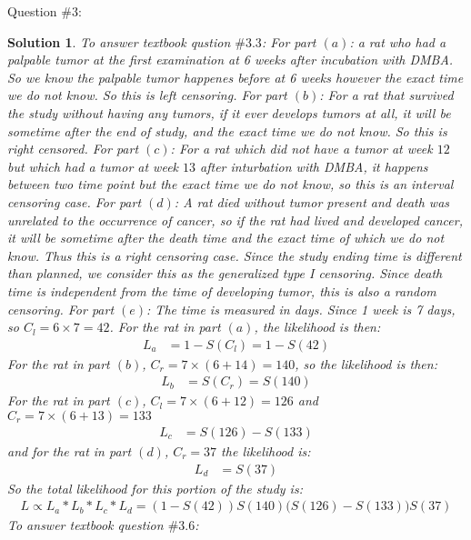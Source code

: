 \documentclass[11pt]{article}
\newtheorem{sol}{Solution}
\begin{document}
Question $\# 3$:
\begin{sol}
	To answer textbook qustion $\# 3.3$:\vskip 2mm
	For part $(a)$:\vskip 2mm
	a rat who had a palpable tumor at the first examination at 6 weeks after incubation with DMBA. So we know the palpable tumor happenes before at 6 weeks however the exact time we do not know. So this is left censoring.\vskip 2mm
	For part $(b)$:\vskip 2mm
	For a rat that survived the study without having any tumors, if it ever develops tumors at all, it will be sometime after the end of study, and the exact time we do not know. So this is right censored.\vskip 2mm
	For part $(c)$:\vskip 2mm
	For a rat which did not have a tumor at week $12$ but which had a tumor at week $13$ after inturbation with DMBA, it happens between two time point but the exact time we do not know, so this is an interval censoring case.\vskip 2mm
	For part $(d)$:\vskip 2mm
	A rat died without tumor present and death was unrelated to the occurrence of cancer, so if the rat had lived and developed cancer, it will be sometime after the death time and the exact time of which we do not know. Thus this is a right censoring case. Since the study ending time is different than planned, we consider this as the generalized type I censoring. Since death time is independent from the time of developing tumor, this is also a random censoring.\vskip 2mm
	For part $(e)$:\vskip 2mm
	The time is measured in days. Since 1 week is 7 days, so $C_l = 6 \times 7 = 42$. For the rat in part $(a)$, the likelihood is then:
	\begin{align*}
		L_a &= 1 - S(C_l) = 1 - S(42)
	\end{align*}
	For the rat in part $(b)$, $C_r = 7 \times (6 + 14) = 140$, so the likelihood is then:
	\begin{align*}
		L_b &= S(C_r) = S(140)
	\end{align*}
	For the rat in part $(c)$, $C_l = 7 \times (6 + 12) = 126$ and $C_r =7 \times (6 + 13) = 133$
	\begin{align*}
		L_c &= S(126) - S(133)
	\end{align*}
	and for the rat in part $(d)$, $C_r= 37$ the likelihood is:
	\begin{align*}
		L_d &= S(37)
	\end{align*}
	So the total likelihood for this portion of the study is:
	\begin{align*}
		L \propto L_a \ast L_b \ast L_c \ast L_d = (1 - S(42))S(140)\Big(S(126) - S(133)\Big)S(37)
	\end{align*}
	To answer textbook question $\#3.6$:\vskip 2mm

\end{sol}
\end{document}
